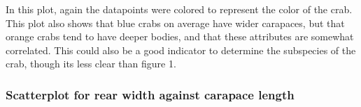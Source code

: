 \documentclass[
]{article}
\newenvironment{Shaded}{}{}
\newcommand{\AttributeTok}[1]{#1}
\newcommand{\CommentTok}[1]{\textcolor[rgb]{0.00,0.50,0.00}{#1}}
\newcommand{\FunctionTok}[1]{#1}
\newcommand{\NormalTok}[1]{#1}
\newcommand{\SpecialCharTok}[1]{\textcolor[rgb]{0.00,0.50,0.50}{#1}}
\newcommand{\StringTok}[1]{\textcolor[rgb]{0.00,0.50,0.50}{#1}}
\begin{document}
In this plot, again the datapoints were colored to represent the color
of the crab. This plot also shows that blue crabs on average have wider
carapaces, but that orange crabs tend to have deeper bodies, and that
these attributes are somewhat correlated. This could also be a good
indicator to determine the subspecies of the crab, though its less clear
than figure 1. \newpage

\hypertarget{scatterplot-for-rear-width-against-carapace-length-1}{%
\subsubsection{Scatterplot for rear width against carapace
length}\label{scatterplot-for-rear-width-against-carapace-length-1}}

\begin{Shaded}
\end{Shaded}
\end{document}
